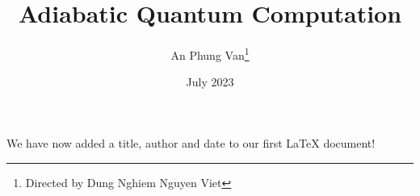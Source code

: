 \documentclass[12pt, letterpaper]{article}
\title{Adiabatic Quantum Computation}
\author{An Phung Van\thanks{Directed by Dung Nghiem Nguyen Viet}}
\date{July 2023}
\begin{document}
\maketitle
We have now added a title, author and date to our first \LaTeX{} document!
\end{document}

